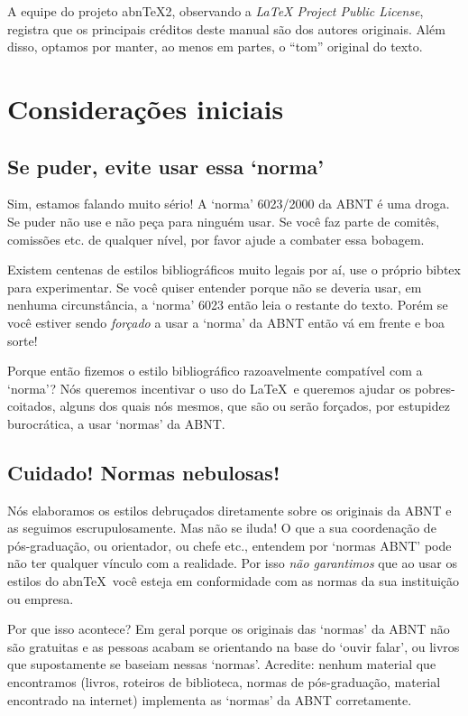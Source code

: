 \documentclass[a4paper]{ltxdoc}
\newcommand{\abnTeX}{abn\TeX}
\begin{document}
A equipe do projeto \abnTeX2, observando a \emph{LaTeX Project Public License},
registra que os principais créditos deste manual são dos autores originais. Além
disso, optamos por manter, ao menos em partes, o ``tom'' original do texto. 

\section{Considerações iniciais}

\subsection{Se puder, evite usar essa `norma'}

Sim, estamos falando muito sério! A `norma' 6023/2000\cite{NBR6023:2000} da ABNT
é uma droga. Se puder não use e não peça para ninguém usar. Se você faz parte de
comitês, comissões etc. de qualquer nível, por favor ajude a combater essa
bobagem.

Existem centenas de estilos bibliográficos muito legais por aí, use o próprio
bibtex para experimentar. Se você quiser entender porque não se deveria usar,
em nenhuma circunstância, a `norma' 6023 então leia o restante do texto.
Porém se você estiver sendo \emph{forçado} a usar a `norma' da ABNT então vá em
frente e boa sorte!

Porque então fizemos o estilo bibliográfico razoavelmente compatível
com a `norma'? Nós queremos incentivar o uso do \LaTeX\  e queremos
ajudar os pobres-coitados, alguns dos quais nós mesmos, que são ou
serão forçados, por estupidez burocrática, a usar `normas' da ABNT.

\subsection{Cuidado! Normas nebulosas!}

Nós elaboramos os estilos debruçados diretamente sobre os originais da ABNT
e as seguimos escrupulosamente. Mas não se iluda! O que a sua coordenação
de pós-graduação, ou orientador, ou chefe etc., entendem por `normas ABNT'
pode não ter qualquer vínculo com a realidade. Por isso \emph{não garantimos}
que ao usar os estilos do \abnTeX\ você esteja em conformidade com as normas
da sua instituição ou empresa.

Por que isso acontece? Em geral porque os originais das `normas' da ABNT não
são gratuitas e as pessoas acabam se orientando na base do
`ouvir falar', ou livros que supostamente se baseiam nessas `normas'.
Acredite: nenhum material que encontramos (livros, roteiros de biblioteca,
normas de pós-graduação, material encontrado na internet) implementa
as `normas' da ABNT corretamente.
\end{document}
